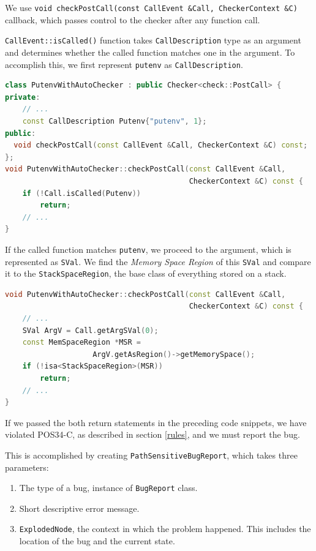 We use \lstinline{void checkPostCall(const CallEvent &Call, CheckerContext &C)} callback, which passes control to the checker after any function call.

\lstinline{CallEvent::isCalled()} function takes \lstinline{CallDescription} type as an argument and determines whether the called function matches one in the argument. To accomplish this, we first represent \lstinline{putenv} as \lstinline{CallDescription}.

\begin{lstlisting}[language={C++}]
class PutenvWithAutoChecker : public Checker<check::PostCall> {
private:
    // ...
    const CallDescription Putenv{"putenv", 1};
public:
  void checkPostCall(const CallEvent &Call, CheckerContext &C) const;
};
void PutenvWithAutoChecker::checkPostCall(const CallEvent &Call,
                                          CheckerContext &C) const {
    if (!Call.isCalled(Putenv))
        return;                                      
    // ...
}
\end{lstlisting}

If the called function matches \lstinline{putenv}, we proceed to the argument, which is represented as \lstinline{SVal}.
We find the \emph{Memory Space Region} of this \lstinline{SVal} and compare it to the \lstinline{StackSpaceRegion}, the base class of everything stored on a stack.

\begin{lstlisting}[language={C++}]
void PutenvWithAutoChecker::checkPostCall(const CallEvent &Call,
                                          CheckerContext &C) const {
    // ...
    SVal ArgV = Call.getArgSVal(0);
    const MemSpaceRegion *MSR = 
                    ArgV.getAsRegion()->getMemorySpace();
    if (!isa<StackSpaceRegion>(MSR))
        return;
    // ...
}
\end{lstlisting}

If we passed the both return statements in the preceding code snippets, we have violated POS34-C, as described in section \ref{rules}, and we must report the bug.

This is accomplished by creating \lstinline{PathSensitiveBugReport}, which takes three parameters:

\begin{enumerate}
    \item The type of a bug, instance of \lstinline{BugReport} class.
    \item Short descriptive error message.
    \item \lstinline{ExplodedNode}, the context in which the problem happened. This includes the location of the bug and the current state.
\end{enumerate}

